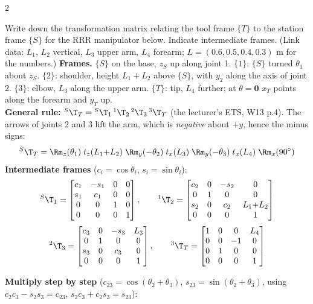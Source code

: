 \begin{multicols}{2}
\begin{examq}
Write down the transformation matrix relating the tool frame $\{T\}$ to the station frame $\{S\}$ for the RRR manipulator below. Indicate intermediate frames. (Link data: $L_1$, $L_2$ vertical, $L_3$ upper arm, $L_4$ forearm; $L=(0.6,0.5,0.4,0.3)$ m for the numbers.)
\solution
\textbf{Frames.} $\{S\}$ on the base, $z_S$ up along joint 1. $\{1\}$: $\{S\}$ turned $\theta_1$ about $z_S$. $\{2\}$: shoulder, height $L_1+L_2$ above $\{S\}$, with $y_2$ along the axis of joint 2. $\{3\}$: elbow, $L_3$ along the upper arm. $\{T\}$: tip, $L_4$ further; at $\theta=\mathbf 0$ $x_T$ points along the forearm and $y_T$ up.\\
\textbf{General rule:} ${}^S\T_T={}^S\T_1\,{}^1\T_2\,{}^2\T_3\,{}^3\T_T$ (the lecturer's ETS, W13 p.4). The arrows of joints 2 and 3 lift the arm, which is \emph{negative} about $+y$, hence the minus signs:
\[{}^S\T_T=\Rm_z(\theta_1)\;t_z(L_1{+}L_2)\;\Rm_y(-\theta_2)\;t_x(L_3)\;\Rm_y(-\theta_3)\;t_x(L_4)\;\Rm_x(90^\circ)\]
\textbf{Intermediate frames} ($c_i=\cos\theta_i$, $s_i=\sin\theta_i$):
\[{}^S\T_1=\begin{bmatrix}c_1&-s_1&0&0\\s_1&c_1&0&0\\0&0&1&0\\0&0&0&1\end{bmatrix},\qquad{}^1\T_2=\begin{bmatrix}c_2&0&-s_2&0\\0&1&0&0\\s_2&0&c_2&L_1{+}L_2\\0&0&0&1\end{bmatrix}\]
\[{}^2\T_3=\begin{bmatrix}c_3&0&-s_3&L_3\\0&1&0&0\\s_3&0&c_3&0\\0&0&0&1\end{bmatrix},\qquad{}^3\T_T=\begin{bmatrix}1&0&0&L_4\\0&0&-1&0\\0&1&0&0\\0&0&0&1\end{bmatrix}\]
\end{examq}
\begin{examq}
\textbf{Multiply step by step} ($c_{23}=\cos(\theta_2+\theta_3)$, $s_{23}=\sin(\theta_2+\theta_3)$, using $c_2c_3-s_2s_3=c_{23}$, $s_2c_3+c_2s_3=s_{23}$):

\end{examq}
\end{multicols}
